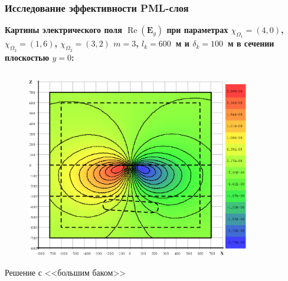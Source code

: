 \documentclass[aspectratio=43]{beamer}
\renewcommand{\Re}{\mathop{\mathrm{Re}}\nolimits}
\newcommand{\MakeTitle}[1]{\frametitle{\hspace{1.5em}\textbf{#1} \hfill \insertframenumber{} }}
\begin{document}
\begin{frame}
	\MakeTitle{Исследование эффективности PML-слоя}
	\textbf{Картины электрического поля $\Re(\mathbf{E}_y)$ при параметрах $\chi_{\Omega_1} = (4, 0)$, $\chi_{\Omega_2} = (1, 6)$, $\chi_{\Omega_2} = (3, 2)$ $m=3$, $l_k = 600$~м и $\delta_k = 100$~м в сечении плоскостью $y=0$:}
	\begin{columns}[t,totalwidth=\linewidth]
		\hspace{-0.07\linewidth}
		\begin{column}{.5\linewidth}
			\vspace{-2.75em}
			\begin{figure}[H]
				\includegraphics[width=1.1\textwidth,height=1.1\textheight,keepaspectratio]{airloop_std_y=0_EyR.eps}
			\end{figure}
			\begin{center}
				\vspace{-1em}
				\tiny{Решение с <<большим баком>>}
			\end{center}
		\end{column}
		\begin{column}{.5\linewidth}
			\vspace{-2.75em}
			\begin{figure}[H]

\end{figure}
\end{column}
\end{columns}
\end{frame}
\end{document}
